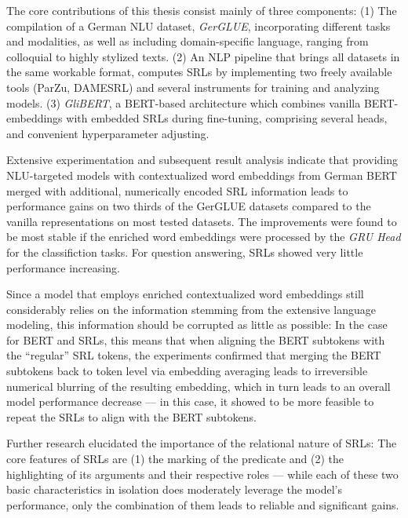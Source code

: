 \label{chap:6_conclusion}



The core contributions of this thesis consist mainly of three components: (1)
The compilation of a German NLU dataset, \emph{GerGLUE}, incorporating different
tasks and modalities, as well as including domain-specific language, ranging from
colloquial to highly stylized texts. (2) An NLP pipeline that brings all datasets in
the same workable format, computes SRLs by implementing two freely available tools
(ParZu, DAMESRL) and several instruments for training and analyzing models. (3)
\emph{GliBERT}, a BERT-based architecture which combines vanilla BERT-embeddings
with embedded SRLs during fine-tuning, comprising several heads, and convenient
hyperparameter adjusting.

Extensive experimentation and subsequent result analysis indicate that providing
NLU-targeted models with contextualized word embeddings from German BERT merged
with additional, numerically encoded SRL information leads to performance gains on
two thirds of the GerGLUE datasets compared to the vanilla representations on most
tested datasets. The improvements were found to be most stable if the enriched
word embeddings were processed by the \emph{GRU Head} for the classifiction tasks.
For question answering, SRLs showed very little performance increasing.

Since a model that employs enriched contextualized word embeddings still considerably relies on the
information stemming from the extensive language modeling, this information should be corrupted as
little as possible: In the case for BERT and SRLs, this means that when aligning the BERT subtokens
with the ``regular'' SRL tokens, the experiments confirmed that merging the BERT subtokens back
to token level via embedding averaging leads to irreversible numerical blurring of the resulting
embedding, which in turn leads to an overall model performance decrease --- in this case, it showed
to be more feasible to repeat the SRLs to align with the BERT subtokens.

Further research elucidated the importance of the relational nature of SRLs: The core
features of SRLs are (1) the marking of the predicate and (2) the highlighting of its
arguments and their respective roles --- while each of these two basic characteristics
in isolation does moderately leverage the model's performance, only the combination of
them leads to reliable and significant gains.

